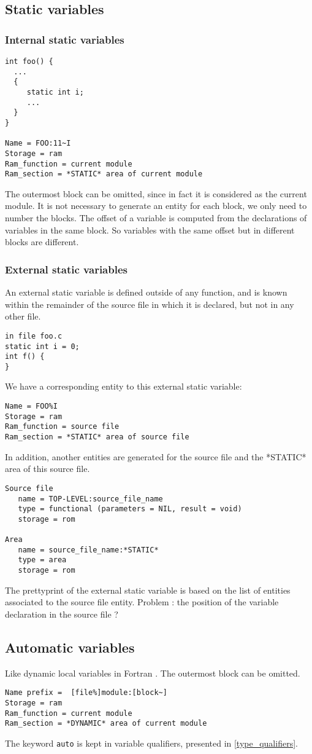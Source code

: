 \documentclass[a4paper]{article}
\begin{document}
\subsection{Static variables}
\subsubsection{Internal static variables}
\begin{verbatim}
int foo() {
  ...
  {
     static int i;
     ...
  } 
}

Name = FOO:11~I
Storage = ram 
Ram_function = current module
Ram_section = *STATIC* area of current module
\end{verbatim}
The outermost block can be omitted, since in fact it is considered as the current module. It is not necessary to generate an entity for each block, we only need to
number the blocks. The offset of a variable is computed from the
declarations of variables in the same block. So variables with the same
offset but in different blocks are different. 
\subsubsection{External static variables}
An external static variable is defined outside of any function, and is
known within the remainder of the source file in which it is declared, but
not in any other file. 
\begin{verbatim}
in file foo.c
static int i = 0; 
int f() {
}
\end{verbatim}
We have a corresponding entity to this external static variable:
\begin{verbatim}
Name = FOO%I
Storage = ram 
Ram_function = source file  
Ram_section = *STATIC* area of source file 
\end{verbatim}
In addition, another entities are generated for the source file and the *STATIC* area of this
source file.
\begin{verbatim}
Source file
   name = TOP-LEVEL:source_file_name
   type = functional (parameters = NIL, result = void)
   storage = rom

Area
   name = source_file_name:*STATIC*
   type = area
   storage = rom
\end{verbatim}
 The prettyprint of the external static variable is based on the list of
entities associated to the source file entity. Problem : the position of the variable
declaration in the source file ? 
\subsection{Automatic variables}
Like dynamic local variables in Fortran \cite{Coel01}. The outermost block can be omitted. 
\begin{verbatim}
Name prefix =  [file%]module:[block~]
Storage = ram 
Ram_function = current module 
Ram_section = *DYNAMIC* area of current module
\end{verbatim}
The keyword \verb/auto/ is kept in variable qualifiers, presented in
\ref{type_qualifiers}. 
\end{document}
